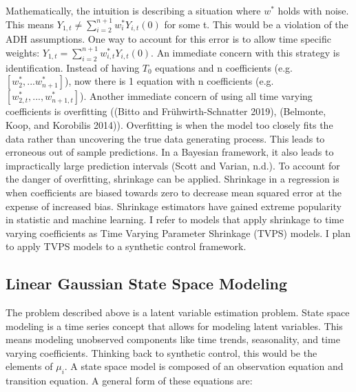 \documentclass[
]{article}
\begin{document}
Mathematically, the intuition is describing a situation where \(w^*\)
holds with noise. This means
\(Y_{1,t} \ne \sum_{i=2}^{n+1} w^*_i Y_{i,t}(0)\) for some t. This would
be a violation of the ADH assumptions. One way to account for this error
is to allow time specific weights:
\(Y_{1,t} = \sum_{i=2}^{n+1} w^*_{i,t} Y_{i,t}(0)\). An immediate
concern with this strategy is identification. Instead of having \(T_0\)
equations and n coefficients (e.g.~\([w^*_2,...w^*_{n+1}]\)), now there
is 1 equation with n coefficients
(e.g.~\([w^*_{2,t},...,w^*_{n+1,t}]\)). Another immediate concern of
using all time varying coefficients is overfitting ((Bitto and
Frühwirth-Schnatter 2019), (Belmonte, Koop, and Korobilis 2014)).
Overfitting is when the model too closely fits the data rather than
uncovering the true data generating process. This leads to erroneous out
of sample predictions. In a Bayesian framework, it also leads to
impractically large prediction intervals (Scott and Varian, n.d.). To
account for the danger of overfitting, shrinkage can be applied.
Shrinkage in a regression is when coefficients are biased towards zero
to decrease mean squared error at the expense of increased bias.
Shrinkage estimators have gained extreme popularity in statistic and
machine learning. I refer to models that apply shrinkage to time varying
coefficients as Time Varying Parameter Shrinkage (TVPS) models. I plan
to apply TVPS models to a synthetic control framework.

\hypertarget{linear-gaussian-state-space-modeling}{%
\subsection{Linear Gaussian State Space
Modeling}\label{linear-gaussian-state-space-modeling}}

The problem described above is a latent variable estimation problem.
State space modeling is a time series concept that allows for modeling
latent variables. This means modeling unobserved components like time
trends, seasonality, and time varying coefficients. Thinking back to
synthetic control, this would be the elements of \(\mu_i\). A state
space model is composed of an observation equation and transition
equation. A general form of these equations are:
\end{document}
